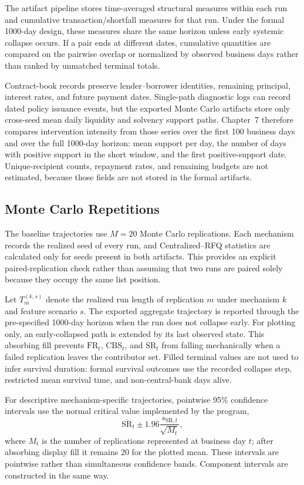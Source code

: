 The artifact pipeline stores time-averaged structural measures within
each run and cumulative transaction/shortfall measures for that run.
Under the formal 1000-day design, these measures share the same horizon
unless early systemic collapse occurs. If a pair ends at different dates,
cumulative quantities are compared on the pairwise overlap or normalized
by observed business days rather than ranked by unmatched terminal totals.

Contract-book records preserve lender--borrower identities, remaining
principal, interest rates, and future payment dates. Single-path diagnostic
logs can record dated policy issuance events, but the exported Monte Carlo
artifacts store only cross-seed mean daily liquidity and solvency support
paths. Chapter~7 therefore compares intervention intensity from those
series over the first 100 business days and over the full 1000-day horizon:
mean support per day, the number of days with positive support in the short
window, and the first positive-support date. Unique-recipient counts,
repayment rates, and remaining budgets are not estimated, because those
fields are not stored in the formal artifacts.

\subsection{Monte Carlo Repetitions}

The baseline trajectories use \(M=20\) Monte Carlo replications. Each
mechanism records the realized seed of every run, and Centralized--RFQ
statistics are calculated only for seeds present in both artifacts. This
provides an explicit paired-replication check rather than assuming that
two runs are paired solely because they occupy the same list position.

Let \(T_m^{(k,s)}\) denote the realized run length of replication
\(m\) under mechanism \(k\) and feature scenario \(s\). The exported
aggregate trajectory is reported through the pre-specified 1000-day
horizon when the run does not collapse early. For plotting only, an
early-collapsed path is extended by its last observed state. This
absorbing fill prevents \(\mathrm{FR}_t\), \(\mathrm{CBS}_t\), and
\(\mathrm{SR}_t\) from falling mechanically when a failed replication
leaves the contributor set. Filled terminal values are not used to infer
survival duration: formal survival outcomes use the recorded collapse
step, restricted mean survival time, and non-central-bank days alive.

For descriptive mechanism-specific trajectories, pointwise 95\%
confidence intervals use the normal critical value implemented by the program,
\begin{equation}
\overline{\mathrm{SR}}_t
\pm
1.96
\frac{s_{\mathrm{SR},t}}{\sqrt{M_t}},
\label{eq:mc-ci}
\end{equation}
\vspace{-0.4\baselineskip}
\noindent
where \(M_t\) is the number of replications represented at business day
\(t\); after absorbing display fill it remains 20 for the plotted mean.
These intervals are pointwise rather than simultaneous confidence bands.
Component intervals are constructed in the same way.

